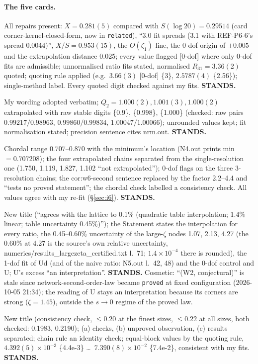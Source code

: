 \documentclass[11pt]{article}
\begin{document}
\paragraph{The five cards.}
\begin{description}[leftmargin=1em,style=nextline]
\item[lattice-vwz-protocol-ratios] All repairs present: $X=0.281(5)$ compared with $S(\log20)=0.29514$ (card
 corner-kernel-closed-form, now in \texttt{related}), ``3.0 fit spreads (3.1 with REF-P6-6's spread 0.0044)'',
 $X/S=0.953(15)$, the $O(\zeta_1)$ line, the 0-dof origin of $\pm0.005$ and the extrapolation distance 0.025; every
 value flagged [0-dof] where only 0-dof fits are admissible; unnormalised ratio fits stated, normalised
 $R_{31}=3.36(2)$ quoted; quoting rule applied (e.g.\ $3.66(3)$ [0-dof] \{3\}, $2.5787(4)$ \{2.56\}); single-method
 label. Every quoted digit checked against my fits. \textbf{STANDS.}
\item[lattice-protocol3-equals-theorem-a] My wording adopted verbatim; $Q_2=1.000(2),1.001(3),1.000(2)$ extrapolated
 with raw stable digits \{0.9\}, \{0.998\}, \{1.000\} (checked: raw pairs $0.99217/0.98963$, $0.99860/0.99834$,
 $1.00047/1.00066$); unrounded values kept; fit normalisation stated; precision sentence cites nrm.out.
 \textbf{STANDS.}
\item[lattice-lr-chains-cross-terms] Chordal range $0.707$--$0.870$ with the minimum's location (N4.out prints
 min $=0.707208$); the four extrapolated chains separated from the single-resolution one (1.750, 1.119, 1.827, 1.102
 ``not extrapolated''); 0-dof flags on the three 3-resolution chains; the cor:w6-second sentence replaced by the
 factor 2.2--4.4 and ``tests no proved statement''; the chordal check labelled a consistency check. All values agree
 with my re-fit (\S\ref{sec:i6}). \textbf{STANDS.}
\item[lattice-general-rule-where-h-fails] New title (``agrees with the lattice to 0.1\% (quadratic table interpolation;
 1.4\% linear; table uncertainty 0.45\%)''); the Statement states the interpolation for every ratio, the 0.45--0.60\%
 uncertainty of the large-$\zeta$ nodes 1.07, 2.13, 4.27 (the 0.60\% at 4.27 is the source's own relative
 uncertainty, numerics/results\_largezeta\_certified.txt l.~71; $1.4\times10^{-4}$ there is rounded), the 1-dof fit
 of Ud (and of the naive ratio: N5.out l.~42, 48) and the 0-dof control and U; U's excess ``an interpretation''.
 \textbf{STANDS.} Cosmetic: ``(W2, conjectural)'' is stale since network-second-order-law became \texttt{proved} at
 fixed configuration (2026-10-05 21:34); the reading of U stays an interpretation because its corners are strong
 ($\zeta=1.45$), outside the $s\to0$ regime of the proved law.
\item[lattice-vwz-bounds-equal-block-chains] New title (consistency check, $\le0.20$ at the finest sizes, $\le0.22$
 at all sizes, both checked: 0.1983, 0.2190); (a) checks, (b) unproved observation, (c) results separated; chain rule
 an identity check; equal-block values by the quoting rule, $4.392(5)\times10^{-3}$ \{4.4e-3\} \ldots\
 $7.390(8)\times10^{-2}$ \{7.4e-2\}, consistent with my fits. \textbf{STANDS.}
\end{description}
\end{document}

